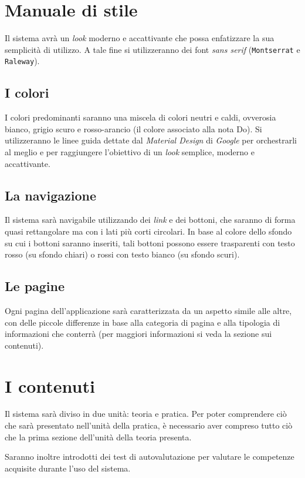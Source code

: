 \section{Manuale di stile}
Il sistema avrà un \emph{look} moderno e accattivante che possa enfatizzare la sua semplicità di utilizzo. A tale fine si utilizzeranno dei font \emph{sans serif} (\texttt{Montserrat} e \texttt{Raleway}).

\subsection{I colori}
I colori predominanti saranno una miscela di colori neutri e caldi, ovverosia bianco, grigio scuro e rosso-arancio (il colore associato alla nota Do). Si utilizzeranno le linee guida dettate dal \emph{Material Design} di \emph{Google} per orchestrarli al meglio e per raggiungere l'obiettivo di un \emph{look} semplice, moderno e accattivante.

\subsection{La navigazione}
Il sistema sarà navigabile utilizzando dei \emph{link} e dei bottoni, che saranno di forma quasi rettangolare ma con i lati più corti circolari. In base al colore dello sfondo su cui i bottoni saranno inseriti, tali bottoni possono essere trasparenti con testo rosso (su sfondo chiari) o rossi con testo bianco (su sfondo scuri).

\subsection{Le pagine} 
Ogni pagina dell'applicazione sarà caratterizzata da un aspetto simile alle altre, con delle piccole differenze in base alla categoria di pagina e alla tipologia di informazioni che conterrà (per maggiori informazioni si veda la sezione sui contenuti).

\section{I contenuti}
Il sistema sarà diviso in due unità: teoria e pratica. Per poter comprendere ciò che sarà presentato nell'unità della pratica, è necessario aver compreso tutto ciò che la prima sezione dell'unità della teoria presenta.

Saranno inoltre introdotti dei test di autovalutazione per valutare le competenze acquisite durante l'uso del sistema.

